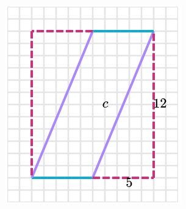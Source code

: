 \begin{solutionbox}{16cm}
\begin{minipage}{0.4\textwidth}
\begin{multicols}{2}
\begin{figure}[H]
                \caption{}
                \label{fig:peri_paralelogramo_03b}
            \end{figure}
        \end{multicols}
        \begin{multicols}{2}
            \begin{figure}[H]
                \centering
                \includegraphics[width=0.9\linewidth]{../images/peri_paralelogramo_03c.png}
                \caption{}
                \label{fig:peri_paralelogramo_03c}
            \end{figure}
            \begin{figure}[H]
                \centering

\end{figure}
\end{multicols}
\end{minipage}
\end{solutionbox}
